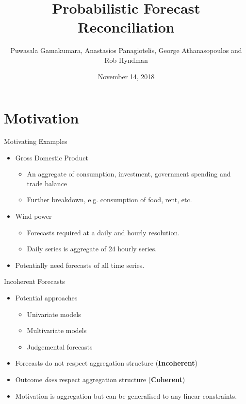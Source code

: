 \documentclass[handout]{beamer}
\title{Probabilistic Forecast Reconciliation}
\date{November 14, 2018}
\author[GPAH]{Puwasala Gamakumara, Anastasios Panagiotelis, George Athanasopoulos and Rob Hyndman}
\begin{document}
  \begin{frame}
    \maketitle
  \end{frame}
  \section{Motivation}
  \begin{frame}{Motivating Examples}
  \begin{itemize}
  	\item Gross Domestic Product
  	\begin{itemize}
  		\item An aggregate of consumption, investment, government spending and trade balance
  		\item Further breakdown, e.g. consumption of food, rent, etc.
  	\end{itemize}
    \item Wind power
    \begin{itemize}
    	\item Forecasts required at a daily and hourly resolution.
    	\item Daily series is aggregate of 24 hourly series.  
    \end{itemize}
    \item Potentially need forecasts of all time series.
  \end{itemize}
  \end{frame}
  \begin{frame}{Incoherent Forecasts}
  \begin{itemize}
    \item Potential approaches
  	\begin{itemize}
  		\item Univariate models
  		\item Multivariate models
  		\item Judgemental forecasts
  	\end{itemize}
  \item Forecasts do not respect aggregation structure ({\bf Incoherent})
  \item Outcome {\em does} respect aggregation  structure ({\bf Coherent})
  \item Motivation is aggregation but can be generalised to any linear constraints.
  \end{itemize}
  \end{frame}
\end{document}
